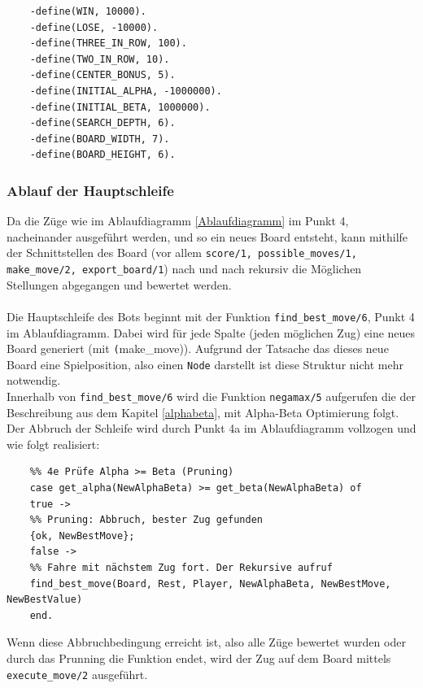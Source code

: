 \begin{verbatim}
	-define(WIN, 10000).
	-define(LOSE, -10000).
	-define(THREE_IN_ROW, 100).
	-define(TWO_IN_ROW, 10).
	-define(CENTER_BONUS, 5).
	-define(INITIAL_ALPHA, -1000000).
	-define(INITIAL_BETA, 1000000).
	-define(SEARCH_DEPTH, 6).
	-define(BOARD_WIDTH, 7).
	-define(BOARD_HEIGHT, 6).
\end{verbatim}

\newpage

\subsubsection{Ablauf der Hauptschleife}
Da die Züge wie im Ablaufdiagramm \ref{Ablaufdiagramm} im Punkt 4, nacheinander ausgeführt werden, und so ein neues Board entsteht, kann mithilfe der Schnittstellen des Board (vor allem \texttt{score/1, possible\_moves/1, make\_move/2, export\_board/1}) nach und nach rekursiv die Möglichen Stellungen abgegangen und bewertet werden.
\\\\
Die Hauptschleife des Bots beginnt mit der Funktion \texttt{find\_best\_move/6}, Punkt 4 im Ablaufdiagramm. Dabei wird für jede Spalte (jeden möglichen Zug) eine neues Board generiert (mit \texttt(make\_move)). Aufgrund der Tatsache das dieses neue Board eine Spielposition, also einen \texttt{Node} darstellt ist diese Struktur nicht mehr notwendig. 
\\
Innerhalb von \texttt{find\_best\_move/6} wird die Funktion \texttt{negamax/5} aufgerufen die der Beschreibung aus dem Kapitel \ref{alphabeta}, mit Alpha-Beta Optimierung folgt. Der Abbruch der Schleife wird durch Punkt 4a im Ablaufdiagramm vollzogen und wie folgt realisiert:

\begin{verbatim}
	%% 4e Prüfe Alpha >= Beta (Pruning)
	case get_alpha(NewAlphaBeta) >= get_beta(NewAlphaBeta) of
	true ->
	%% Pruning: Abbruch, bester Zug gefunden
	{ok, NewBestMove};
	false ->
	%% Fahre mit nächstem Zug fort. Der Rekursive aufruf
	find_best_move(Board, Rest, Player, NewAlphaBeta, NewBestMove, NewBestValue)
	end.
\end{verbatim}

Wenn diese Abbruchbedingung erreicht ist, also alle Züge bewertet wurden oder durch das Prunning die Funktion endet, wird der Zug auf dem Board mittels \texttt{execute\_move/2} ausgeführt.

\newpage